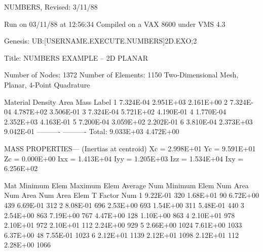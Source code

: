      NUMBERS, Revised:  3/11/88

     Run on 03/11/88 at 12:56:34
     Compiled on a VAX 8600 under VMS 4.3

     Genesis: UB:[USERNAME.EXECUTE.NUMBERS]2D.EXO;2

     Title:   NUMBERS EXAMPLE -- 2D PLANAR

     Number of Nodes:      1372
     Number of Elements:   1150
     Two-Dimensional Mesh, Planar, 4-Point Quadrature

     Material    Density         Area           Mass        Label
         1      7.324E-04      2.951E+03      2.161E+00
         2      7.324E-04      4.787E+02      3.506E-01
         3      7.324E-04      5.721E+02      4.190E-01
         4      1.770E-04      2.352E+03      4.163E-01
         5      7.200E-04      3.059E+02      2.202E-01
         6      3.810E-04      2.373E+03      9.042E-01
                              ----------     ----------
                  Total:       9.033E+03      4.472E+00

     MASS PROPERTIES--- (Inertias at centroid)
      Xc =  2.998E+01   Yc =  9.591E+01   Zc =  0.000E+00
     Ixx =  1.413E+04  Iyy =  1.205E+03  Izz =  1.534E+04
     Ixy =  6.256E+02

     Mat  Minimum   Elem   Maximum   Elem   Average   Num    Minimum   Elem
     Num    Area    Num      Area    Num      Area    Elem   T Factor  Num
      1   9.22E-01   320   1.68E+01    90   6.72E+00   439   6.69E-01   312
      2   8.08E-01   696   2.53E+00   693   1.54E+00   311   5.48E-01   440
      3   2.54E+00   863   7.19E+00   767   4.47E+00   128   1.10E+00   863
      4   2.10E+01   978   2.10E+01   972   2.10E+01   112   2.24E+00   929
      5   2.66E+00  1024   7.61E+00  1033   6.37E+00    48   7.55E-01  1023
      6   2.12E+01  1139   2.12E+01  1098   2.12E+01   112   2.28E+00  1066
